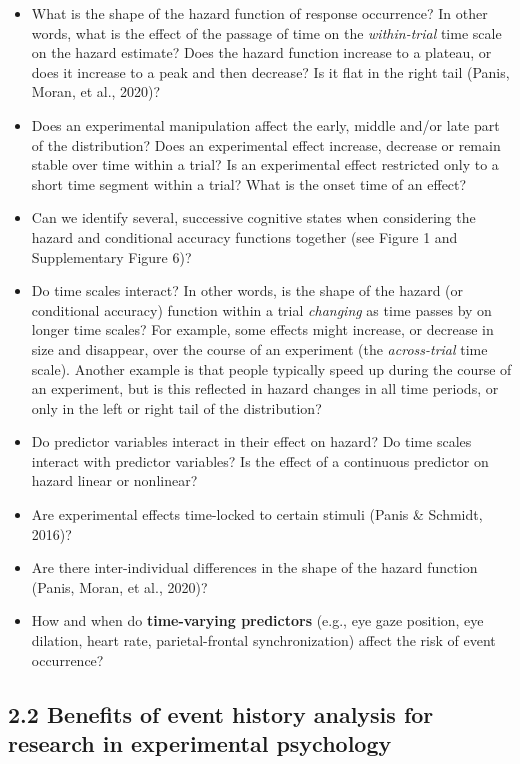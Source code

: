 \documentclass[
  english,
  man, donotrepeattitle,floatsintext]{apa6}
\begin{document}
\begin{itemize}
\item
  What is the shape of the hazard function of response occurrence? In other words, what is the effect of the passage of time on the \emph{within-trial} time scale on the hazard estimate? Does the hazard function increase to a plateau, or does it increase to a peak and then decrease? Is it flat in the right tail (Panis, Moran, et al., 2020)?
\item
  Does an experimental manipulation affect the early, middle and/or late part of the distribution? Does an experimental effect increase, decrease or remain stable over time within a trial? Is an experimental effect restricted only to a short time segment within a trial? What is the onset time of an effect?
\item
  Can we identify several, successive cognitive states when considering the hazard and conditional accuracy functions together (see Figure 1 and Supplementary Figure 6)?
\item
  Do time scales interact? In other words, is the shape of the hazard (or conditional accuracy) function within a trial \emph{changing} as time passes by on longer time scales? For example, some effects might increase, or decrease in size and disappear, over the course of an experiment (the \emph{across-trial} time scale). Another example is that people typically speed up during the course of an experiment, but is this reflected in hazard changes in all time periods, or only in the left or right tail of the distribution?
\item
  Do predictor variables interact in their effect on hazard? Do time scales interact with predictor variables? Is the effect of a continuous predictor on hazard linear or nonlinear?
\item
  Are experimental effects time-locked to certain stimuli (Panis \& Schmidt, 2016)?
\item
  Are there inter-individual differences in the shape of the hazard function (Panis, Moran, et al., 2020)?
\item
  How and when do \textbf{time-varying predictors} (e.g., eye gaze position, eye dilation, heart rate, parietal-frontal synchronization) affect the risk of event occurrence?
\end{itemize}

\subsection{2.2 Benefits of event history analysis for research in experimental psychology}\label{benefits-of-event-history-analysis-for-research-in-experimental-psychology}
\end{document}
